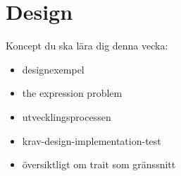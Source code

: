 \chapter{Design}\label{chapter:W13}
Koncept du ska lära dig denna vecka:
\begin{multicols}{2}\begin{itemize}[nosep,label={$\square$},leftmargin=*]
\item designexempel
\item the expression problem
\item utvecklingsprocessen
\item krav-design-implementation-test
\item översiktligt om trait som gränssnitt\end{itemize}\end{multicols}
